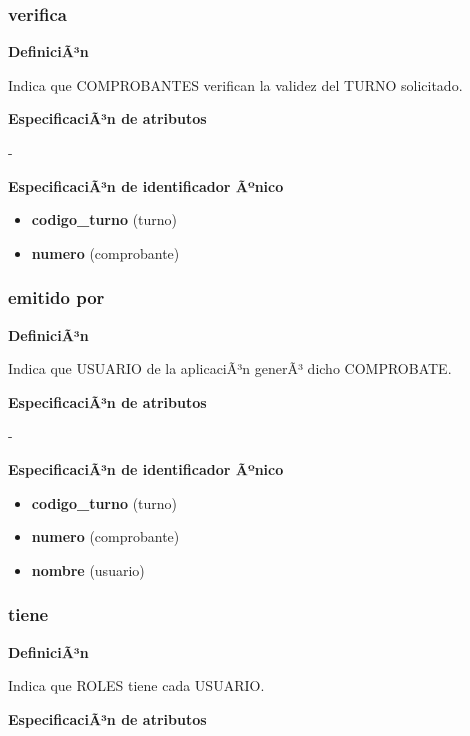 \documentclass[a4paper,11pt]{article}
\begin{document}
\subsubsection{\textbf{verifica}}

\textbf{DefiniciÃ³n}

Indica que COMPROBANTES verifican la validez del TURNO solicitado.

\textbf{EspecificaciÃ³n de atributos}

-

\textbf{EspecificaciÃ³n de identificador Ãºnico}

\begin{itemize}

     \item \textbf{codigo\_turno} (turno)

     \item \textbf{numero} (comprobante)

\end{itemize}

\subsubsection{\textbf{emitido por}}

\textbf{DefiniciÃ³n}

Indica que USUARIO de la aplicaciÃ³n generÃ³ dicho COMPROBATE.

\textbf{EspecificaciÃ³n de atributos}

-

\textbf{EspecificaciÃ³n de identificador Ãºnico}

\begin{itemize}

     \item \textbf{codigo\_turno} (turno)

     \item \textbf{numero} (comprobante)

     \item \textbf{nombre} (usuario)

\end{itemize}

\subsubsection{\textbf{tiene}}

\textbf{DefiniciÃ³n}

Indica que ROLES tiene cada USUARIO.

\textbf{EspecificaciÃ³n de atributos}
\end{document}
